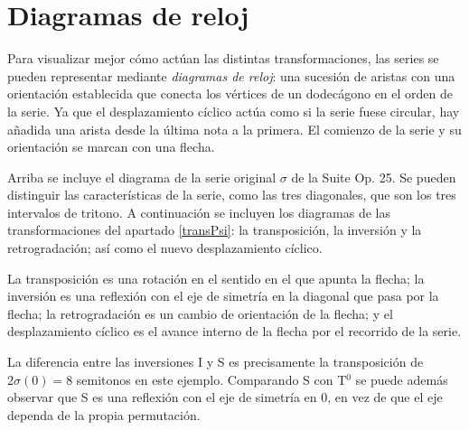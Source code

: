 	\section{Diagramas de reloj}
	\label{diagramas}
	
		\begin{wrapfigure}{R}{0.2\textwidth}
			\vspace{-\bigskipamount}
			\vspace{-\bigskipamount}
		\end{wrapfigure} Para visualizar mejor cómo actúan las distintas transformaciones, las series se pueden representar mediante \textit{diagramas de reloj}: una sucesión de aristas con una orientación establecida que conecta los vértices de un dodecágono en el orden de la serie. Ya que el desplazamiento cíclico actúa como si la serie fuese circular, hay añadida una arista desde la última nota a la primera. El comienzo de la serie y su orientación se marcan con una flecha.
		
		Arriba se incluye el diagrama de la serie original $\sigma$ de la Suite Op. 25. Se pueden distinguir las características de la serie, como las tres diagonales, que son los tres intervalos de tritono. A continuación se incluyen los diagramas de las transformaciones del apartado \ref{transPsi}: la transposición, la inversión y la retrogradación; así como el nuevo desplazamiento cíclico.
		
\begin{changemargin}{-15pt}{-15pt}
	\begin{multicols}{4}
	\end{multicols}
\end{changemargin}
		
		La transposición es una rotación en el sentido en el que apunta la flecha; la inversión es una reflexión con el eje de simetría en la diagonal que pasa por la flecha; la retrogradación es un cambio de orientación de la flecha; y el desplazamiento cíclico es el avance interno de la flecha por el recorrido de la serie.		
		
		La diferencia entre las inversiones I y S es precisamente la transposición de $2\sigma(0)=8$ semitonos en este ejemplo. Comparando S con T$^0$ se puede además observar que S es una reflexión con el eje de simetría en 0, en vez de que el eje dependa de la propia permutación.
		
